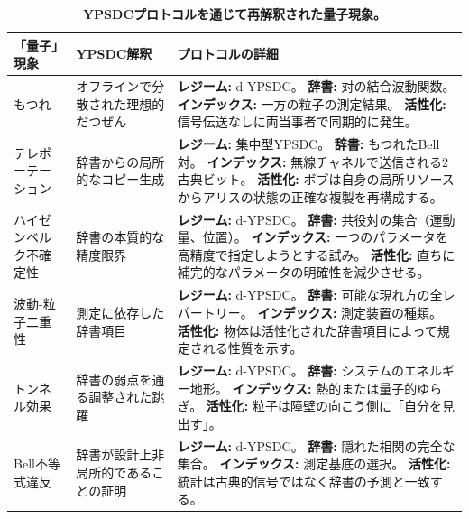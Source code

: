 \documentclass[12pt,a4paper]{article}
\theoremstyle{definition}
\theoremstyle{remark}
\begin{document}
	\begin{table}[htbp]
		\centering
		\caption{\normalsize\textbf{YPSDCプロトコルを通じて再解釈された量子現象。}}
		\label{tab:quantum-ypsdc}
		\small
		\begin{tabular}{p{2.5cm} p{4.8cm} p{7.8cm}}
			\toprule
			\textbf{「量子」現象} &
			\textbf{YPSDC解釈} &
			\textbf{プロトコルの詳細} \\
			\midrule
			もつれ &
			オフラインで分散された理想的だつぜん &
			\textbf{レジーム:} d-YPSDC。\newline
			\textbf{辞書:} 対の結合波動関数。\newline
			\textbf{インデックス:} 一方の粒子の測定結果。\newline
			\textbf{活性化:} 信号伝送なしに両当事者で同期的に発生。 \\
			\midrule
			テレポーテーション &
			辞書からの局所的なコピー生成 &
			\textbf{レジーム:} 集中型YPSDC。\newline
			\textbf{辞書:} もつれたBell対。\newline
			\textbf{インデックス:} 無線チャネルで送信される2古典ビット。\newline
			\textbf{活性化:} ボブは自身の局所リソースからアリスの状態の正確な複製を再構成する。 \\
			\midrule
			ハイゼンベルク不確定性 &
			辞書の本質的な精度限界 &
			\textbf{レジーム:} d-YPSDC。\newline
			\textbf{辞書:} 共役対の集合（運動量、位置）。\newline
			\textbf{インデックス:} 一つのパラメータを高精度で指定しようとする試み。\newline
			\textbf{活性化:} 直ちに補完的なパラメータの明確性を減少させる。 \\
			\midrule
			波動-粒子二重性 &
			測定に依存した辞書項目 &
			\textbf{レジーム:} d-YPSDC。\newline
			\textbf{辞書:} 可能な現れ方の全レパートリー。\newline
			\textbf{インデックス:} 測定装置の種類。\newline
			\textbf{活性化:} 物体は活性化された辞書項目によって規定される性質を示す。 \\
			\midrule
			トンネル効果 &
			辞書の弱点を通る調整された跳躍 &
			\textbf{レジーム:} d-YPSDC。\newline
			\textbf{辞書:} システムのエネルギー地形。\newline
			\textbf{インデックス:} 熱的または量子的ゆらぎ。\newline
			\textbf{活性化:} 粒子は障壁の向こう側に「自分を見出す」。 \\
			\midrule
			Bell不等式違反 &
			辞書が設計上非局所的であることの証明 &
			\textbf{レジーム:} d-YPSDC。\newline
			\textbf{辞書:} 隠れた相関の完全な集合。\newline
			\textbf{インデックス:} 測定基底の選択。\newline
			\textbf{活性化:} 統計は古典的信号ではなく辞書の予測と一致する。 \\
			\bottomrule
		\end{tabular}
	\end{table}
	
\end{document}
